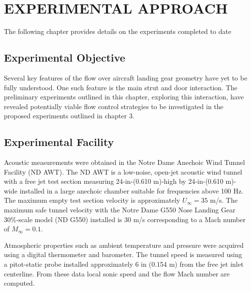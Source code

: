 %
%
%
%
%
%
%
%
%
%


%
%

\chapter{EXPERIMENTAL APPROACH}
The following chapter provides details on the experiments completed to date

\section{Experimental Objective}
Several key features of the flow over aircraft landing gear geometry have yet to be fully understood. One such feature is the main strut and door interaction. The preliminary experiments outlined in this chapter, exploring this interaction, have revealed potentially viable flow control strategies to be investigated in the proposed experiments outlined in chapter 3.


\section{Experimental Facility}
Acoustic measurements were obtained in the Notre Dame Anechoic Wind Tunnel Facility (ND AWT). The ND AWT is a low-noise, open-jet acoustic wind tunnel with a free jet test section measuring 24-in-(0.610 m)-high by 24-in-(0.610 m)-wide installed in a large anechoic chamber suitable for frequencies above 100 Hz. The maximum empty test section velocity is approximately $U_\infty = 35$ m/s. The maximum safe tunnel velocity with the Notre Dame G550 Nose Landing Gear 30\%-scale model (ND G550) installed is  30 m/s corresponding to a Mach number of $M_\infty=0.1$.

Atmospheric properties such as ambient temperature and pressure were acquired using a digital thermometer and barometer. The tunnel speed is measured using a pitot-static probe installed approximately 6 in (0.154 m) from the free jet inlet centerline. From these data local sonic speed and the flow Mach number are computed.

